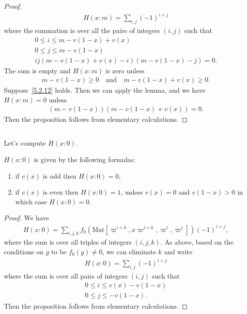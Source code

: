 \begin{proof}
\begin{align}
    H(x:m) = \sum_{i, j}(-1)^{i+j}
\end{align}
where the summation is over all the pairs of integers $(i, j)$ such that
\begin{gather}
    0 \leq i \leq m - v(1-x) + v(x) \\
    0 \leq j \leq m - v(1-x) \\
    ij(m-v(1-x)+v(x)-i)(m-v(1-x)-j)=0.
\end{gather}
The sum is empty and $H(x:m)$ is zero unless
\begin{align}
\label{5.2.12}
    m - v(1-x) \geq 0 \quad \text{and} \quad m - v(1-x) + v(x) \geq 0.
\end{align}
Suppose~\eqref{5.2.12} holds.
Then we can apply the lemma, and we have $H(x:m)=0$ unless
\begin{align}
    (m-v(1-x))(m-v(1-x)+v(x)) =0.
\end{align}
Then the proposition follows from elementary calculations.
\end{proof}

\subsection{}
Let's compute $H(x:0)$.
\begin{proposition}\label{prop:5.3}
    $H(x:0)$ is given by the following formulas:
    \begin{enumerate}
        \item if $v(x)$ is odd then $H(x:0) =0$,
        \item if $v(x)$ is even then $H(x:0) =1$, unless $v(x)=0$ and $v(1-x)>0$ in which case $H(x:0)=0$.
    \end{enumerate}
\end{proposition}
\begin{proof}
We have
\begin{align}
    H(x:0) = \sum_{i, j, k} f_{0}(\mathrm{Mat}[\varpi^{i+k}, x\varpi^{j+k}, \varpi^i, \varpi^j]) (-1)^{i+j},
\end{align}
where the sum is over all triples of integers $(i, j, k)$.
As above, based on the conditions on $g$ to be $f_0(g)\neq 0$, we can eliminate $k$ and write
\begin{align}
    H(x:0) = \sum_{i, j} (-1)^{i+j}
\end{align}
where the sum is over all pairs of integers $(i, j)$ such that
\begin{align}
    0 \leq i \leq v(x) - v(1-x) \\
    0 \leq j \leq -v(1-x).
\end{align}
Then the proposition follows from elementary calculations.
\end{proof}

